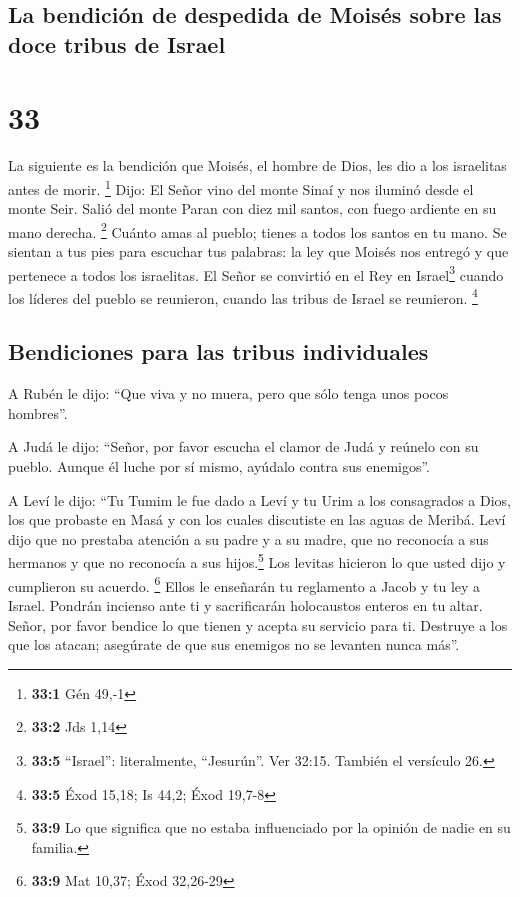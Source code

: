 \hypertarget{la-bendiciuxf3n-de-despedida-de-moisuxe9s-sobre-las-doce-tribus-de-israel}{%
\subsection{La bendición de despedida de Moisés sobre las doce tribus de
Israel}\label{la-bendiciuxf3n-de-despedida-de-moisuxe9s-sobre-las-doce-tribus-de-israel}}

\hypertarget{section-32}{%
\section{33}\label{section-32}}

 La siguiente es la bendición que Moisés, el hombre de
Dios, les dio a los israelitas antes de morir. \footnote{\textbf{33:1}
  Gén 49,-1}  Dijo: El Señor vino del monte Sinaí y nos
iluminó desde el monte Seir. Salió del monte Paran con diez mil santos,
con fuego ardiente en su mano derecha. \footnote{\textbf{33:2} Jds 1,14}
 Cuánto amas al pueblo; tienes a todos los santos en tu
mano. Se sientan a tus pies para escuchar tus palabras: 
la ley que Moisés nos entregó y que pertenece a todos los israelitas.
 El Señor se convirtió en el Rey en Israel\footnote{\textbf{33:5}
  ``Israel'': literalmente, ``Jesurún''. Ver 32:15. También el versículo
  26.} cuando los líderes del pueblo se reunieron, cuando las tribus de
Israel se reunieron. \footnote{\textbf{33:5} Éxod 15,18; Is 44,2; Éxod
  19,7-8}

\hypertarget{bendiciones-para-las-tribus-individuales}{%
\subsection{Bendiciones para las tribus
individuales}\label{bendiciones-para-las-tribus-individuales}}

 A Rubén le dijo: ``Que viva y no muera, pero que sólo
tenga unos pocos hombres''.

 A Judá le dijo: ``Señor, por favor escucha el clamor de
Judá y reúnelo con su pueblo. Aunque él luche por sí mismo, ayúdalo
contra sus enemigos''.

 A Leví le dijo: ``Tu Tumim le fue dado a Leví y tu Urim a
los consagrados a Dios, los que probaste en Masá y con los cuales
discutiste en las aguas de Meribá.  Leví dijo que no
prestaba atención a su padre y a su madre, que no reconocía a sus
hermanos y que no reconocía a sus hijos.\footnote{\textbf{33:9} Lo que
  significa que no estaba influenciado por la opinión de nadie en su
  familia.} Los levitas hicieron lo que usted dijo y cumplieron su
acuerdo. \footnote{\textbf{33:9} Mat 10,37; Éxod 32,26-29}
 Ellos le enseñarán tu reglamento a Jacob y tu ley a
Israel. Pondrán incienso ante ti y sacrificarán holocaustos enteros en
tu altar.  Señor, por favor bendice lo que tienen y
acepta su servicio para ti. Destruye a los que los atacan; asegúrate de
que sus enemigos no se levanten nunca más''.

